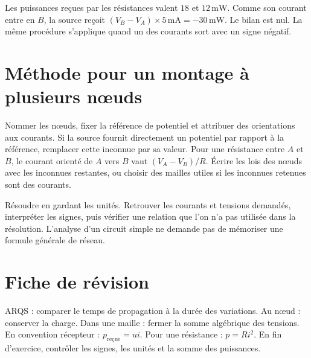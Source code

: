 \documentclass[11pt,a4paper]{article}
\begin{document}
Les puissances reçues par les résistances valent $18$ et $12\,\mathrm{mW}$. Comme son courant entre en $B$, la source reçoit $(V_B-V_A)\times5\,\mathrm{mA}=-30\,\mathrm{mW}$. Le bilan est nul. La même procédure s’applique quand un des courants sort avec un signe négatif.

\section*{Méthode pour un montage à plusieurs nœuds}
Nommer les nœuds, fixer la référence de potentiel et attribuer des orientations aux courants. Si la source fournit directement un potentiel par rapport à la référence, remplacer cette inconnue par sa valeur. Pour une résistance entre $A$ et $B$, le courant orienté de $A$ vers $B$ vaut $(V_A-V_B)/R$. Écrire les lois des nœuds avec les inconnues restantes, ou choisir des mailles utiles si les inconnues retenues sont des courants.

Résoudre en gardant les unités. Retrouver les courants et tensions demandés, interpréter les signes, puis vérifier une relation que l’on n’a pas utilisée dans la résolution. L’analyse d’un circuit simple ne demande pas de mémoriser une formule générale de réseau.

\section*{Fiche de révision}
ARQS : comparer le temps de propagation à la durée des variations. Au nœud : conserver la charge. Dans une maille : fermer la somme algébrique des tensions. En convention récepteur : $p_{\text{reçue}}=ui$. Pour une résistance : $p=Ri^2$. En fin d’exercice, contrôler les signes, les unités et la somme des puissances.
\end{document}
